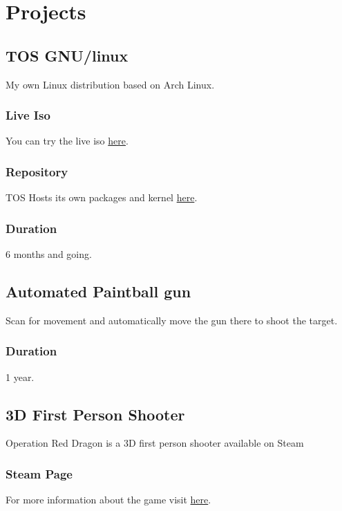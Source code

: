 \section{Proje\textcolor{mycolor}{cts}}
  \subsection{TOS GNU/linux}
    My own Linux distribution based on Arch Linux.
    \subsubsection{Live Iso}
      You can try the live iso \href{https://tos.pbfp.xyz}{here}.
    \subsubsection{Repository}
      TOS Hosts its own packages and kernel \href{https://repo.pbfp.xyz/list.html}{here}.
    \subsubsection{Duration}
      6 months and going.
  \subsection{Automated Paintball gun}
     Scan for movement and automatically move the gun there to shoot the target.
    \subsubsection{Duration}
      1 year.
  \subsection{3D First Person Shooter}
    Operation Red Dragon is a 3D first person shooter available on Steam
    \subsubsection{Steam Page}
      For more information about the game visit \href{https://store.steampowered.com/app/747730/Operation_Red_Dragon/}{here}.